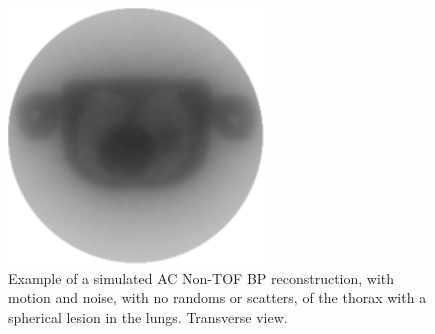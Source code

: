             \begin{figure}
                \centering
                
                \includegraphics[width=1.0\linewidth]{figures/background_bp_example.png}
                
                \captionsetup{singlelinecheck=false, justification=raggedright}
                \caption{Example of a simulated \gls{AC} \gls{Non-TOF} \gls{BP} reconstruction, with motion and noise, with no randoms or scatters, of the thorax with a spherical lesion in the lungs. Transverse view.}
                \label{fig:analytic_image_reconstruction_bp_example}
            \end{figure}
            
